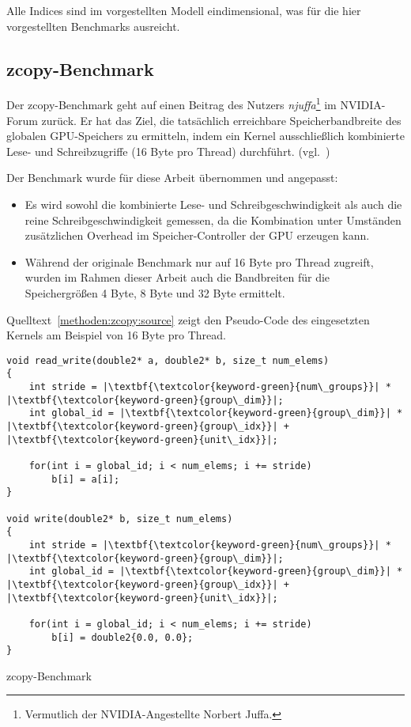 Alle Indices sind im vorgestellten Modell eindimensional, was für die hier
vorgestellten Benchmarks ausreicht.

\subsection{zcopy-Benchmark}
\label{methoden:zcopy}

Der zcopy-Benchmark geht auf einen Beitrag des Nutzers \textit{njuffa}\footnote{
Vermutlich der NVIDIA-Angestellte Norbert Juffa.} im NVIDIA-Forum zurück. Er
hat das Ziel, die tatsächlich erreichbare Speicherbandbreite des globalen
GPU-Speichers zu ermitteln, indem ein Kernel ausschließlich kombinierte Lese-
und Schreibzugriffe (16 Byte pro Thread) durchführt. (vgl.~\cite{njuffa2017})

Der Benchmark wurde für diese Arbeit übernommen und angepasst:

\begin{itemize}
    \item Es wird sowohl die kombinierte Lese- und Schreibgeschwindigkeit als
          auch die reine Schreibgeschwindigkeit gemessen, da die Kombination
          unter Umständen zusätzlichen Overhead im Speicher-Controller der GPU
          erzeugen kann.
    \item Während der originale Benchmark nur auf 16 Byte pro Thread zugreift,
          wurden im Rahmen dieser Arbeit auch die Bandbreiten für die
          Speichergrößen 4 Byte, 8 Byte und 32 Byte ermittelt.
\end{itemize}

Quelltext~\ref{methoden:zcopy:source} zeigt den Pseudo-Code des eingesetzten
Kernels am Beispiel von 16 Byte pro Thread.

\begin{code}
    \begin{verbatim}
void read_write(double2* a, double2* b, size_t num_elems)
{
    int stride = |\textbf{\textcolor{keyword-green}{num\_groups}}| * |\textbf{\textcolor{keyword-green}{group\_dim}}|;
    int global_id = |\textbf{\textcolor{keyword-green}{group\_dim}}| * |\textbf{\textcolor{keyword-green}{group\_idx}}| + |\textbf{\textcolor{keyword-green}{unit\_idx}}|;

    for(int i = global_id; i < num_elems; i += stride)
        b[i] = a[i];
}

void write(double2* b, size_t num_elems)
{
    int stride = |\textbf{\textcolor{keyword-green}{num\_groups}}| * |\textbf{\textcolor{keyword-green}{group\_dim}}|;
    int global_id = |\textbf{\textcolor{keyword-green}{group\_dim}}| * |\textbf{\textcolor{keyword-green}{group\_idx}}| + |\textbf{\textcolor{keyword-green}{unit\_idx}}|;

    for(int i = global_id; i < num_elems; i += stride)
        b[i] = double2{0.0, 0.0};
}
    \end{verbatim}
    \caption{zcopy-Benchmark}
    \label{methoden:zcopy:source}
\end{code}

